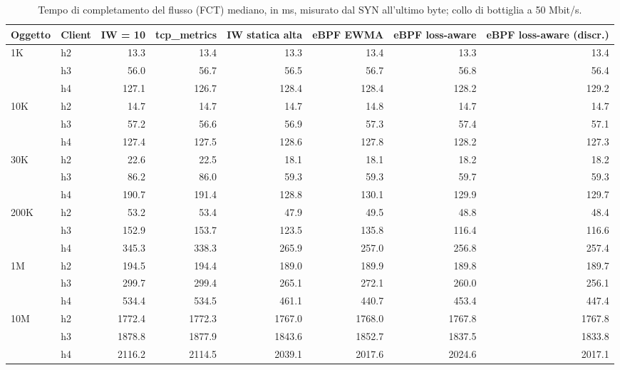 \begin{table}[htbp]
  \centering
  \caption{Tempo di completamento del flusso (FCT) mediano, in ms, misurato dal SYN all'ultimo byte; collo di bottiglia a 50 Mbit/s.}
  \label{tab:fct-med-50}
  \begin{tabular}{llrrrrrr}
    \toprule
    Oggetto & Client & IW = 10 & tcp\_metrics & IW statica alta & eBPF EWMA & eBPF loss-aware & eBPF loss-aware (discr.) \\
    \midrule
    1K & h2 & 13.3 & 13.4 & 13.3 & 13.4 & 13.3 & 13.4 \\
     & h3 & 56.0 & 56.7 & 56.5 & 56.7 & 56.8 & 56.4 \\
     & h4 & 127.1 & 126.7 & 128.4 & 128.4 & 128.2 & 129.2 \\
    \addlinespace
    10K & h2 & 14.7 & 14.7 & 14.7 & 14.8 & 14.7 & 14.7 \\
     & h3 & 57.2 & 56.6 & 56.9 & 57.3 & 57.4 & 57.1 \\
     & h4 & 127.4 & 127.5 & 128.6 & 127.8 & 128.2 & 127.3 \\
    \addlinespace
    30K & h2 & 22.6 & 22.5 & 18.1 & 18.1 & 18.2 & 18.2 \\
     & h3 & 86.2 & 86.0 & 59.3 & 59.3 & 59.7 & 59.3 \\
     & h4 & 190.7 & 191.4 & 128.8 & 130.1 & 129.9 & 129.7 \\
    \addlinespace
    200K & h2 & 53.2 & 53.4 & 47.9 & 49.5 & 48.8 & 48.4 \\
     & h3 & 152.9 & 153.7 & 123.5 & 135.8 & 116.4 & 116.6 \\
     & h4 & 345.3 & 338.3 & 265.9 & 257.0 & 256.8 & 257.4 \\
    \addlinespace
    1M & h2 & 194.5 & 194.4 & 189.0 & 189.9 & 189.8 & 189.7 \\
     & h3 & 299.7 & 299.4 & 265.1 & 272.1 & 260.0 & 256.1 \\
     & h4 & 534.4 & 534.5 & 461.1 & 440.7 & 453.4 & 447.4 \\
    \addlinespace
    10M & h2 & 1772.4 & 1772.3 & 1767.0 & 1768.0 & 1767.8 & 1767.8 \\
     & h3 & 1878.8 & 1877.9 & 1843.6 & 1852.7 & 1837.5 & 1833.8 \\
     & h4 & 2116.2 & 2114.5 & 2039.1 & 2017.6 & 2024.6 & 2017.1 \\
    \bottomrule
  \end{tabular}
\end{table}
